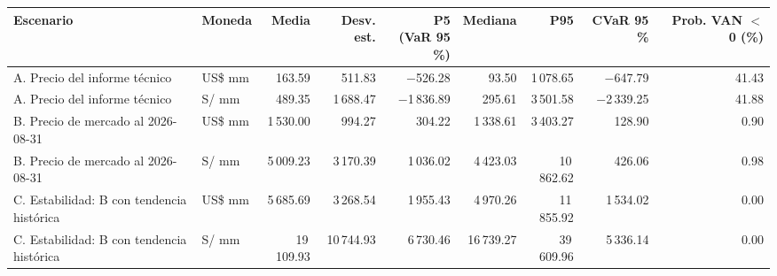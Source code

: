 \begin{adjustbox}{max width=\linewidth}
\begin{tabular}{>{\raggedright\arraybackslash}p{3.2cm}lrrrrrrr}
\toprule
Escenario & Moneda & Media & Desv. est. & \makecell[r]{P5\\(VaR 95 \%)} & Mediana & P95 & CVaR 95 \% & \makecell[r]{Prob. VAN $<$ 0\\(\%)} \\
\midrule
A. Precio del informe técnico & US\$ mm & 163.59 & 511.83 & $-$526.28 & 93.50 & 1\,078.65 & $-$647.79 & 41.43 \\
A. Precio del informe técnico & S/ mm & 489.35 & 1\,688.47 & $-$1\,836.89 & 295.61 & 3\,501.58 & $-$2\,339.25 & 41.88 \\
B. Precio de mercado al 2026-08-31 & US\$ mm & 1\,530.00 & 994.27 & 304.22 & 1\,338.61 & 3\,403.27 & 128.90 & 0.90 \\
B. Precio de mercado al 2026-08-31 & S/ mm & 5\,009.23 & 3\,170.39 & 1\,036.02 & 4\,423.03 & 10\,862.62 & 426.06 & 0.98 \\
C. Estabilidad: B con tendencia histórica & US\$ mm & 5\,685.69 & 3\,268.54 & 1\,955.43 & 4\,970.26 & 11\,855.92 & 1\,534.02 & 0.00 \\
C. Estabilidad: B con tendencia histórica & S/ mm & 19\,109.93 & 10\,744.93 & 6\,730.46 & 16\,739.27 & 39\,609.96 & 5\,336.14 & 0.00 \\
\bottomrule
\end{tabular}
\end{adjustbox}
